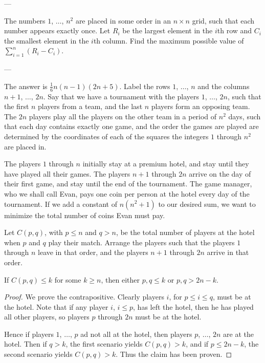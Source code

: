 
---

The numbers $1$, $\ldots$, $n^2$ are placed in some order in an $n\times n$ grid, such that each number appears exactly once. Let $R_i$ be the largest element in the $i$th row and $C_i$ the smallest element in the $i$th column. Find the maximum possible value of $\sum_{i=1}^n(R_i-C_i)$.

---

The answer is $\frac16n(n-1)(2n+5)$. Label the rows $1$, $\ldots$, $n$ and the columns $n+1$, $\ldots$, $2n$. Say that we have a tournament with the players $1$, $\ldots$, $2n$, such that the first $n$ players from a team, and the last $n$ players form an opposing team. The $2n$ players play all the players on the other team in a period of $n^2$ days, such that each day contains exactly one game, and the order the games are played are determined by the coordinates of each of the squares the integers $1$ through $n^2$ are placed in.

The players $1$ through $n$ initially stay at a premium hotel, and stay until they have played all their games. The players $n+1$ through $2n$ arrive on the day of their first game, and stay until the end of the tournament. The game manager, who we shall call Evan, pays one coin per person at the hotel every day of the tournament. If we add a constant of $n(n^2+1)$ to our desired sum, we want to minimize the total number of coins Evan must pay.

Let $C(p,q)$, with $p\le n$ and $q>n$, be the total number of players at the hotel when $p$ and $q$ play their match. Arrange the players such that the players $1$ through $n$ leave in that order, and the players $n+1$ through $2n$ arrive in that order.
\begin{iclaim*}
    If $C(p,q)\le k$ for some $k\ge n$, then either $p,q\le k$ or $p,q>2n-k$.
\end{iclaim*}
\begin{proof}
    We prove the contrapositive. Clearly players $i$, for $p\le i\le q$, must be at the hotel. Note that if any player $i$, $i\le p$, has left the hotel, then he has played all other players, so players $p$ through $2n$ must be at the hotel.

    Hence if players $1$, $\ldots$, $p$ ad not all at the hotel, then players $p$, $\ldots$, $2n$ are at the hotel. Then if $q>k$, the first scenario yields $C(p,q)>k$, and if $p\le 2n-k$, the second scenario yields $C(p,q)>k$. Thus the claim has been proven.
\end{proof}

